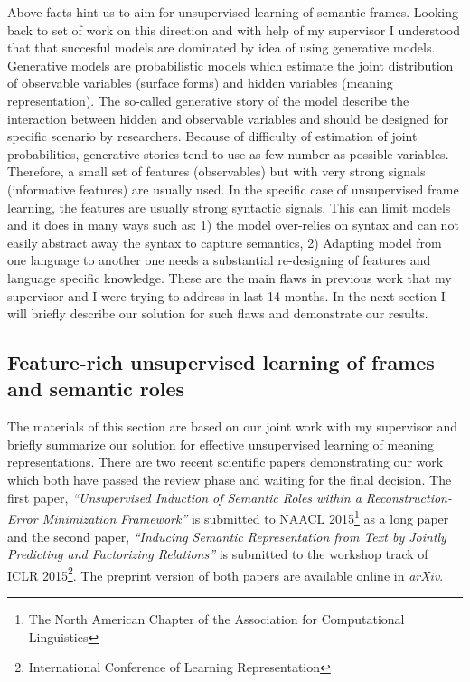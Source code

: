 Above facts hint us to aim for unsupervised learning of semantic-frames. Looking
back to set of work on this direction and with help of my supervisor I
understood that that succesful models are dominated by idea of using
generative models. Generative models are probabilistic models which estimate the joint distribution of
observable variables (surface forms) and hidden variables (meaning
representation). The so-called generative story of the model describe the
interaction between hidden and observable variables and should be designed for
specific scenario by researchers. Because of difficulty of estimation of joint
probabilities, generative stories tend to use as few number as possible
variables. Therefore, a small set of features (observables) but with very strong
signals (informative features) are usually used. In the specific case
of unsupervised frame learning, the features are usually strong syntactic
signals. This can limit models and it does in many ways such as: 1) the model
over-relies on syntax and can not easily abstract away the syntax to capture
semantics, 2) Adapting model from one language to another one needs a
substantial re-designing of features and language specific knowledge. These are
the main flaws in previous work that my supervisor and I were trying to address
in last 14 months. In the next section I will briefly describe our solution for
such flaws and demonstrate our results.

\subsection{Feature-rich unsupervised learning of frames and semantic roles}
\label{ssec:feat-usp-sem-parse}

The materials of this section are based on our joint work with my supervisor and
briefly summarize our solution for effective unsupervised learning of meaning
representations. There are two recent scientific papers demonstrating our work
which both have passed the review phase and waiting for the final decision. The
first paper, \emph{``Unsupervised Induction of Semantic Roles within a
Reconstruction-Error Minimization Framework''} is submitted to NAACL
2015\footnote{The North American Chapter of the Association for Computational Linguistics} as a long paper and the second paper, 
\emph{``Inducing Semantic Representation from Text by Jointly Predicting and
Factorizing Relations''} is submitted to the workshop track of ICLR
2015\footnote{International Conference of Learning Representation}. The preprint
version of both papers are available online in \emph{arXiv}.



